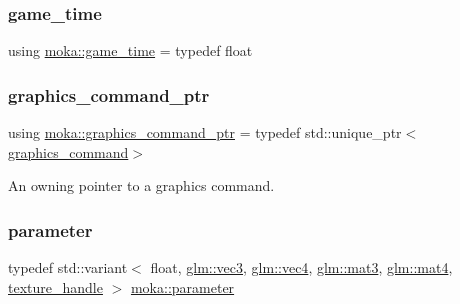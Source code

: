 \mbox{\label{namespacemoka_a4b8e94fbfa287169990f1cc8171c0984}} 
\subsubsection{\texorpdfstring{game\_time}{game\_time}}
{\footnotesize\ttfamily using \mbox{\hyperlink{namespacemoka_a4b8e94fbfa287169990f1cc8171c0984}{moka\+::game\+\_\+time}} = typedef float}

\mbox{\label{namespacemoka_a11189394b29b63aee831baa2166596db}} 
\subsubsection{\texorpdfstring{graphics\_command\_ptr}{graphics\_command\_ptr}}
{\footnotesize\ttfamily using \mbox{\hyperlink{namespacemoka_a11189394b29b63aee831baa2166596db}{moka\+::graphics\+\_\+command\+\_\+ptr}} = typedef std\+::unique\+\_\+ptr$<$\mbox{\hyperlink{classmoka_1_1graphics__command}{graphics\+\_\+command}}$>$}



An owning pointer to a graphics command. 

\mbox{\label{namespacemoka_afdb5f6e8afb209971d12dec045ec48ee}} 
\subsubsection{\texorpdfstring{parameter}{parameter}}
{\footnotesize\ttfamily typedef std\+::variant$<$ float, \mbox{\hyperlink{namespacemoka_aed2224bc0e5b79e57a8975ded94ee1aaa97ade28e93c0de60adc075bdbe07ca36}{glm\+::vec3}}, \mbox{\hyperlink{namespacemoka_aed2224bc0e5b79e57a8975ded94ee1aaa1a9028fd802c481a99491a418ca2fe86}{glm\+::vec4}}, \mbox{\hyperlink{namespacemoka_aed2224bc0e5b79e57a8975ded94ee1aaa0dd87e9dfdea657e8be233b5836821d0}{glm\+::mat3}}, \mbox{\hyperlink{namespacemoka_aed2224bc0e5b79e57a8975ded94ee1aaabe14b41eb96410ea28b32bc138d885ae}{glm\+::mat4}}, \mbox{\hyperlink{structmoka_1_1texture__handle}{texture\+\_\+handle}} $>$ \mbox{\hyperlink{namespacemoka_afdb5f6e8afb209971d12dec045ec48ee}{moka\+::parameter}}}

